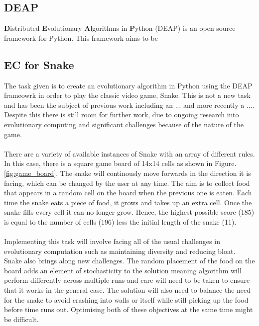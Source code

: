 \documentclass{article}
\begin{document}

\subsection{DEAP}
\textbf{D}istributed \textbf{E}volutionary \textbf{A}lgorithms in \textbf{P}ython (DEAP) is an open source framework for Python\cite{deap}. This framework aims to be 

\subsection{EC for Snake}
The task given is to create an evolutionary algorithm in Python using the DEAP frameowrk in order to play the classic video game, Snake. This is not a new task and has been the subject of previous work including an ...\cite{snake_blog} and more recently a ...\cite{snake_paper}. Despite this there is still room for further work, due to ongoing research into evolutionary computing and significant challenges because of the nature of the game.
\\\\
There are a variety of available instances of Snake with an array of different rules. In this case, there is a square game board of 14x14 cells as shown in Figure. \ref{fig:game_board}. The snake will continously move forwards in the direction it is facing, which can be changed by the user at any time. The aim is to collect food that appears in a random cell on the board when the previous one is eaten. Each time the snake eats a piece of food, it grows and takes up an extra cell. Once the snake fills every cell it can no longer grow. Hence, the highest possible score (185) is equal to the number of cells (196) less the initial length of the snake (11).
\\\\
Implementing this task will involve facing all of the usual challenges in evolutionary computation such as maintaining diversity and reducing bloat. Snake also brings along new challenges. The random placement of the food on the board adds an element of stochasticity to the solution meaning algorithm will perform differently across multiple runs and care will need to be taken to ensure that it works in the general case. The solution will also need to balance the need for the snake to avoid crashing into walls or itself while still picking up the food before time runs out. Optimising both of these objectives at the same time might be difficult.
\end{document}
